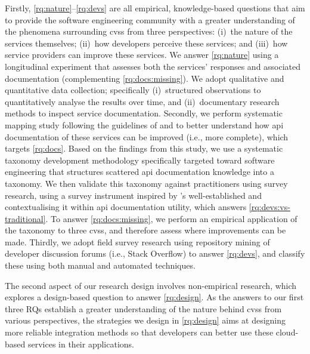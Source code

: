 Firstly, \ref{rq:nature}--\ref{rq:devs} are all empirical, knowledge-based questions \citep{Easterbrook:2007ws,Meltzoff:1998wg} that aim to provide the software engineering community with a greater understanding of the phenomena surrounding \glspl{cvs} from three perspectives: (i)~the nature of the services themselves; (ii)~how developers perceive these services; and (iii)~how service providers can improve these services.  We answer \ref{rq:nature} using a longitudinal experiment that assesses both the services' responses and associated documentation (complementing \ref{rq:docs:missing}). We adopt qualitative and quantitative data collection; specifically (i)~structured observations to quantitatively analyse the results over time, and (ii)~documentary research methods to inspect service documentation.
Secondly, we perform systematic mapping study following the guidelines of \citet{Kitchenham:2007dd} and \citet{Petersen:2008td} to better understand how \gls{api} documentation of these services can be improved (i.e., more complete), which targets \ref{rq:docs}. Based on the findings from this study, we use a systematic taxonomy development methodology specifically targeted toward software engineering \citep{Usman:2017hn} that structures scattered \gls{api} documentation knowledge into a taxonomy. We then validate this taxonomy against practitioners using survey research, using a survey instrument inspired by \citeauthor{Brooke:1996ua}'s well-established  \citep{Brooke:1996ua}  and contextualising it within \gls{api} documentation utility, which answers \ref{rq:devs:vs-traditional}. To answer \ref{rq:docs:missing}, we perform an empirical application of the taxonomy to three \glspl{cvs}, and therefore assess where improvements can be made.
Thirdly, we adopt field survey research using repository mining of developer discussion forums (i.e., Stack Overflow) to answer \ref{rq:devs}, and classify these using both manual and automated techniques.

The second aspect of our research design involves non-empirical research, which explores a design-based question \citep{Simon:1996uw} to answer \ref{rq:design}. As the answers to our first three RQs establish a greater understanding of the nature behind \glspl{cvs} from various perspectives, the strategies we design in \ref{rq:design} aims at designing more reliable integration methods so that developers can better use these cloud-based services in their applications.